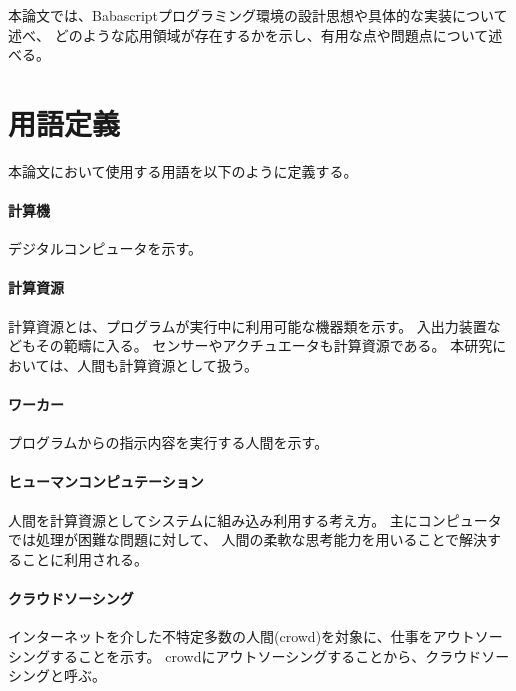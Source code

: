 本論文では、Babascriptプログラミング環境の設計思想や具体的な実装について述べ、
どのような応用領域が存在するかを示し、有用な点や問題点について述べる。

\section{用語定義}\label{ux7528ux8a9eux5b9aux7fa9}

本論文において使用する用語を以下のように定義する。

\paragraph{計算機}\label{ux8a08ux7b97ux6a5f}

デジタルコンピュータを示す。

\paragraph{計算資源}\label{ux8a08ux7b97ux8cc7ux6e90}

計算資源とは、プログラムが実行中に利用可能な機器類を示す。
入出力装置などもその範疇に入る。
センサーやアクチュエータも計算資源である。
本研究においては、人間も計算資源として扱う。

\paragraph{ワーカー}\label{ux30efux30fcux30abux30fc}

プログラムからの指示内容を実行する人間を示す。

\paragraph{ヒューマンコンピュテーション}\label{ux30d2ux30e5ux30fcux30deux30f3ux30b3ux30f3ux30d4ux30e5ux30c6ux30fcux30b7ux30e7ux30f3}

人間を計算資源としてシステムに組み込み利用する考え方。
主にコンピュータでは処理が困難な問題に対して、
人間の柔軟な思考能力を用いることで解決することに利用される。

\paragraph{クラウドソーシング}\label{ux30afux30e9ux30a6ux30c9ux30bdux30fcux30b7ux30f3ux30b0}

インターネットを介した不特定多数の人間(crowd)を対象に、仕事をアウトソーシングすることを示す。
crowdにアウトソーシングすることから、クラウドソーシングと呼ぶ。

